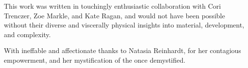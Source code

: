 \documentclass[11pt]{article}
\begin{document}
\vspace*{12\baselineskip}

\begingroup
\begin{center}
This work was written in touchingly enthusiastic collaboration with Cori Trenczer, Zoe Markle, and Kate Ragan, and would not have been possible without their diverse and viscerally physical insights into material, development, and complexity.
\end{center}
\endgroup

\vspace*{4\baselineskip}

\begingroup
\begin{center}
With ineffable and affectionate thanks to Natasia Reinhardt, for her contagious empowerment, and her mystification of the once demystified.
\end{center}
\endgroup
\end{document}
